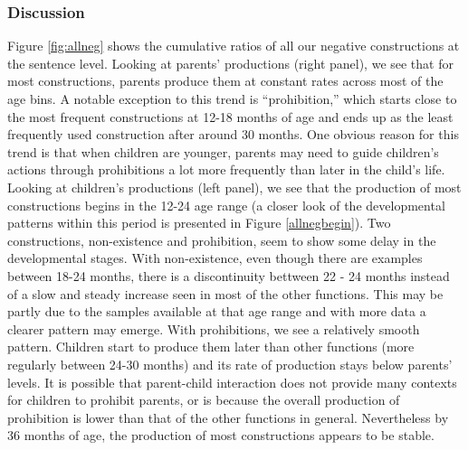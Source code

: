 \documentclass[
  english,
  man,floatsintext]{apa6}
\begin{document}
\hypertarget{discussion}{%
\subsubsection{Discussion}\label{discussion}}

Figure \ref{fig:allneg} shows the cumulative ratios of all our negative constructions at the sentence level. Looking at parents' productions (right panel), we see that for most constructions, parents produce them at constant rates across most of the age bins. A notable exception to this trend is ``prohibition,'' which starts close to the most frequent constructions at 12-18 months of age and ends up as the least frequently used construction after around 30 months. One obvious reason for this trend is that when children are younger, parents may need to guide children's actions through prohibitions a lot more frequently than later in the child's life. Looking at children's productions (left panel), we see that the production of most constructions begins in the 12-24 age range (a closer look of the developmental patterns within this period is presented in Figure \ref{allnegbegin}). Two constructions, non-existence and prohibition, seem to show some delay in the developmental stages. With non-existence, even though there are examples between 18-24 months, there is a discontinuity bettween 22 - 24 months instead of a slow and steady increase seen in most of the other functions. This may be partly due to the samples available at that age range and with more data a clearer pattern may emerge. With prohibitions, we see a relatively smooth pattern. Children start to produce them later than other functions (more regularly between 24-30 months) and its rate of production stays below parents' levels. It is possible that parent-child interaction does not provide many contexts for children to prohibit parents, or is because the overall production of prohibition is lower than that of the other functions in general. Nevertheless by 36 months of age, the production of most constructions appears to be stable.
\end{document}
